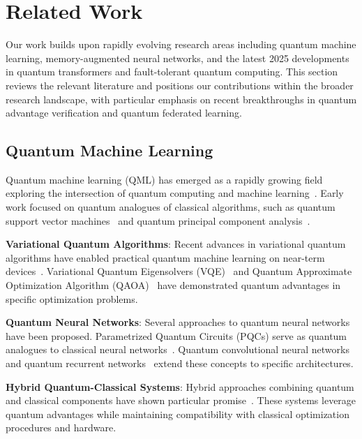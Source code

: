 \section{Related Work}
\label{sec:related}

Our work builds upon rapidly evolving research areas including quantum machine learning, memory-augmented neural networks, and the latest 2025 developments in quantum transformers and fault-tolerant quantum computing. This section reviews the relevant literature and positions our contributions within the broader research landscape, with particular emphasis on recent breakthroughs in quantum advantage verification and quantum federated learning.

\subsection{Quantum Machine Learning}

Quantum machine learning (QML) has emerged as a rapidly growing field exploring the intersection of quantum computing and machine learning~\cite{biamonte2017quantum, schuld2015introduction}. Early work focused on quantum analogues of classical algorithms, such as quantum support vector machines~\cite{rebentrost2014quantum} and quantum principal component analysis~\cite{lloyd2014quantum}.

\textbf{Variational Quantum Algorithms}: Recent advances in variational quantum algorithms have enabled practical quantum machine learning on near-term devices~\cite{cerezo2021variational}. Variational Quantum Eigensolvers (VQE)~\cite{peruzzo2014variational} and Quantum Approximate Optimization Algorithm (QAOA)~\cite{farhi2014quantum} have demonstrated quantum advantages in specific optimization problems.

\textbf{Quantum Neural Networks}: Several approaches to quantum neural networks have been proposed. Parametrized Quantum Circuits (PQCs) serve as quantum analogues to classical neural networks~\cite{schuld2019quantum, benedetti2019parameterized}. Quantum convolutional neural networks~\cite{cong2019quantum} and quantum recurrent networks~\cite{chen2022quantum} extend these concepts to specific architectures.

\textbf{Hybrid Quantum-Classical Systems}: Hybrid approaches combining quantum and classical components have shown particular promise~\cite{mitarai2018quantum, schuld2020circuit}. These systems leverage quantum advantages while maintaining compatibility with classical optimization procedures and hardware.

